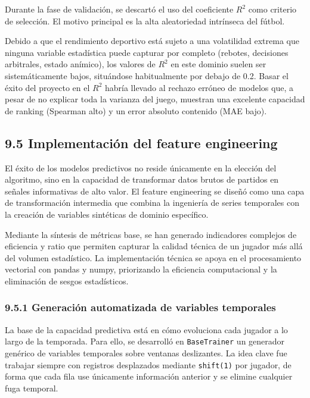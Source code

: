 Durante la fase de validación, se descartó el uso del coeficiente $R^2$ como criterio de selección. El motivo principal es la alta aleatoriedad intrínseca del fútbol.
 
Debido a que el rendimiento deportivo está sujeto a una volatilidad extrema que ninguna variable estadística puede capturar por completo (rebotes,
decisiones arbitrales, estado anímico), los valores de $R^2$ en este dominio suelen ser sistemáticamente bajos, situándose habitualmente por debajo de 0.2.
Basar el éxito del proyecto en el $R^2$ habría llevado al rechazo erróneo de modelos que, a pesar de no explicar toda la varianza del juego, muestran una
excelente capacidad de ranking (Spearman alto) y un error absoluto contenido (MAE bajo).
 
\subsection{9.5 Implementación del feature engineering}
 
El éxito de los modelos predictivos no reside únicamente en la elección del algoritmo, sino en la capacidad de transformar datos brutos de partidos en
señales informativas de alto valor. El feature engineering se diseñó como una capa de transformación intermedia que combina la ingeniería de series temporales
con la creación de variables sintéticas de dominio específico.
 
Mediante la síntesis de métricas base, se han generado indicadores complejos de eficiencia y
ratio que permiten capturar la calidad técnica de un jugador más allá del volumen estadístico. La implementación técnica se apoya en el procesamiento vectorial
con pandas y numpy, priorizando la eficiencia computacional y la eliminación de sesgos estadísticos.
 
\subsubsection{9.5.1 Generación automatizada de variables temporales}
 
La base de la capacidad predictiva está en cómo evoluciona cada jugador a lo largo de la temporada. Para ello, se desarrolló en \texttt{BaseTrainer} un generador
genérico de variables temporales sobre ventanas deslizantes. La idea clave fue trabajar siempre con registros desplazados mediante \texttt{shift(1)} por jugador,
de forma que cada fila use únicamente información anterior y se elimine cualquier fuga temporal.
 
